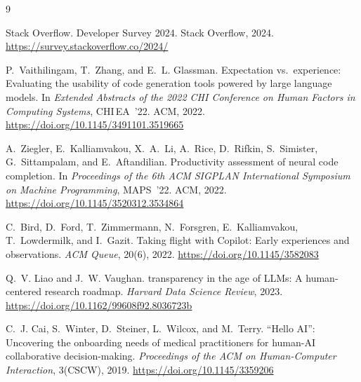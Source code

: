 \documentclass[11pt,a4paper]{article}
\begin{document}

\begin{thebibliography}{9}

Stack Overflow.
\newblock Developer Survey 2024.
\newblock Stack Overflow, 2024.
\newblock \url{https://survey.stackoverflow.co/2024/}

P.~Vaithilingam, T.~Zhang, and E.~L. Glassman.
\newblock Expectation vs.\ experience: Evaluating the usability of code
  generation tools powered by large language models.
\newblock In \emph{Extended Abstracts of the 2022 {CHI} Conference on Human
  Factors in Computing Systems}, {CHI\,EA}~'22. {ACM}, 2022.
\newblock \url{https://doi.org/10.1145/3491101.3519665}

A.~Ziegler, E.~Kalliamvakou, X.~A.~Li, A.~Rice, D.~Rifkin, S.~Simister,
  G.~Sittampalam, and E.~Aftandilian.
\newblock Productivity assessment of neural code completion.
\newblock In \emph{Proceedings of the 6th {ACM} {SIGPLAN} International
  Symposium on Machine Programming}, {MAPS}~'22. {ACM}, 2022.
\newblock \url{https://doi.org/10.1145/3520312.3534864}

C.~Bird, D.~Ford, T.~Zimmermann, N.~Forsgren, E.~Kalliamvakou, T.~Lowdermilk,
  and I.~Gazit.
\newblock Taking flight with {Copilot}: Early experiences and observations.
\newblock \emph{{ACM} Queue}, 20(6), 2022.
\newblock \url{https://doi.org/10.1145/3582083}

Q.~V. Liao and J.~W. Vaughan.
 transparency in the age of {LLMs}: A human-centered research
  roadmap.
\newblock \emph{Harvard Data Science Review}, 2023.
\newblock \url{https://doi.org/10.1162/99608f92.8036723b}

C.~J. Cai, S.~Winter, D.~Steiner, L.~Wilcox, and M.~Terry.
\newblock ``{H}ello {AI}'': Uncovering the onboarding needs of medical
  practitioners for human-{AI} collaborative decision-making.
\newblock \emph{Proceedings of the {ACM} on Human-Computer Interaction},
  3({CSCW}), 2019.
\newblock \url{https://doi.org/10.1145/3359206}

\end{thebibliography}
\end{document}
